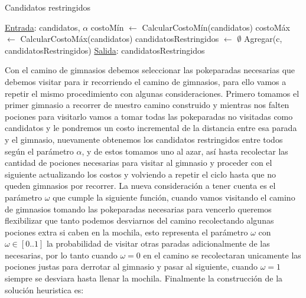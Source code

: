 \begin{algorithm}[H]

\label{}
\caption{Candidatos restringidos}

\begin{algorithmic}[1]

\Statex \underline{Entrada}: candidatos, $\alpha$
\medskip
\State costoM\'in $\gets$ CalcularCostoM\'in(candidatos)
\State costoM\'ax $\gets$ CalcularCostoM\'ax(candidatos)
\State candidatosRestringidos $\gets$ $\emptyset$
		\State Agregar(c, candidatosRestringidos)
	\EndIf
\EndFor
\medskip
\Statex \underline{Salida}: candidatosRestringidos

\end{algorithmic}
\end{algorithm}

Con el camino de gimnasios debemos seleccionar las pokeparadas necesarias que debemos visitar para ir recorriendo el camino de gimnasios, para ello vamos a repetir el mismo procedimiento con algunas consideraciones. Primero tomamos el primer gimnasio a recorrer de nuestro camino construido y mientras nos falten pociones para visitarlo vamos a tomar todas las pokeparadas no visitadas como candidatos y le pondremos un costo incremental de la distancia entre esa parada y el gimnasio, nuevamente obtenemos los candidatos restringidos entre todos según el parámetro $\alpha$, y de estos tomamos uno al azar, así hasta recolectar las cantidad de pociones necesarias para visitar al gimnasio y proceder con el siguiente actualizando los costos y volviendo a repetir el ciclo hasta que no queden gimnasios por recorrer. La nueva consideración a tener cuenta es el parámetro $\omega$ que cumple la siguiente función, cuando vamos visitando el camino de gimnasios tomando las pokeparadas necesarias para vencerlo queremos flexibilizar que tanto podemos desviarnos del camino recolectando algunas pociones extra si caben en la mochila, esto representa el parámetro $\omega$ con $\omega \in [0..1]$ la probabilidad de visitar otras paradas adicionalmente de las necesarias, por lo tanto cuando $\omega = 0$ en el camino se recolectaran unicamente las pociones justas para derrotar al gimnasio y pasar al siguiente, cuando $\omega = 1$ siempre se desviara hasta llenar la mochila. Finalmente la construcción de la solución heuristica es:

